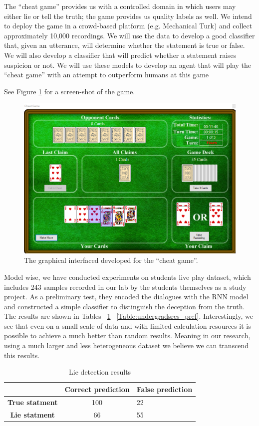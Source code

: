 The ``cheat game'' provides us with a controlled domain in which users may either lie or tell the truth; the game provides us quality labels as well. We intend to deploy the game in a crowd-based platform (e.g. Mechanical Turk) and collect approximately 10,000 recordings. We will use the data to develop a good classifier that, given an utterance, will determine whether the statement is true or false. We will also develop a classifier that will predict whether a statement raises suspicion or not.
We will use these models to develop an agent that will play the ``cheat game'' with an attempt to outperform humans at this game

See Figure \ref{fig:cheatgamegui} for a screen-shot of the game.

\begin{figure}[tbph]
	\centering
	\includegraphics[width=4.5in]{Chapters/cheat_game_GUI}
	\caption{The graphical interfaced developed for the ``cheat game''.}
	\label{fig:cheatgamegui}
\end{figure}


Model wise, we have conducted experiments on students live play dataset, which includes 243 samples recorded in our lab by the students themselves as a study project. As a preliminary test, they encoded the dialogues with the RNN model and constructed a simple classifier to distinguish the deception from the truth. The results are shown in Tables ~\ref{Table:undergradsres} ~\ref{Table:undergradsres_pref}. Interestingly, we see that even on a small scale of data and with limited calculation resources it is possible to achieve a much better than random results. Meaning in our research, using a much larger and less heterogeneous dataset we believe we can transcend this results.   


\begin{table}[tbph]
	\centering
	\begin{tabular}{|c|c|l|}
		\hline
		\textbf{}              & \textbf{Correct prediction} & \textbf{False prediction} \\ \hline
		\textbf{True statment} & 100                         & 22                        \\ \hline
		\textbf{Lie statment}  & 66                          & 55                        \\ \hline
	\end{tabular}
	\caption{Lie detection results }
	\label{Table:undergradsres}
\end{table}

